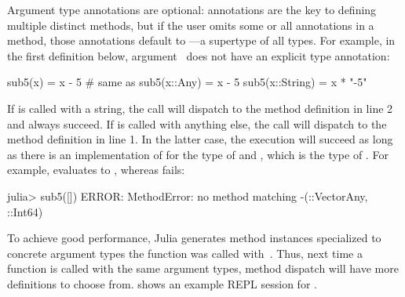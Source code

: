 Argument type annotations are optional: annotations are the key to defining
multiple distinct methods, but if the user omits some or all
annotations in a method, those annotations default to ---a supertype
of all types.
For example, in the first  definition below, argument~
does not have an explicit type annotation:
\begin{codeenvd}
\begin{julia}
sub5(x) = x - 5             # same as sub5(x::Any) = x - 5
sub5(x::String) = x * "-5"
\end{julia}
\end{codeenvd}
If  is called with a string, the call will dispatch to the method 
definition in line 2 and always succeed. 
If  is called with anything else,
the call will dispatch to the method definition in line 1. 
In the latter case, the execution will succeed
as long as there is an implementation of \cjl{(-)} for the type of 
and , which is the type of .
For example,  evaluates to ,
whereas  fails:
\begin{codeenvd}
\begin{julia}
julia> sub5([])
ERROR: MethodError: no method matching -(::Vector{Any}, ::Int64)
\end{julia}
\end{codeenvd}
To achieve good performance, Julia generates method instances
specialized to concrete argument types the function was called
with~\cite{bib:pelenitsyn:type-stability:oopsla:2021}.
Thus, next time a function is called with the same argument types,
method dispatch will have more definitions to choose from.
 shows an example REPL session for .

